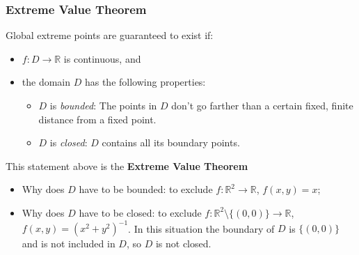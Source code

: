 \begin{frame}
  \frametitle{Extreme Value Theorem}

Global extreme points are guaranteed to exist if:

\begin{itemize}
  \item $f \colon D \to \mathbb{R}$ is continuous, and
  \item the domain $D$ has the following properties:
  \begin{itemize}
    \item $D$ is \emph{bounded}: The points in $D$ don't go farther than a certain fixed, finite distance from a fixed point.
    \item $D$ is \emph{closed}: $D$ contains all its boundary points.
  \end{itemize}
\end{itemize}
%

This statement above is the \textbf{Extreme Value Theorem}

\begin{itemize}
  \item \pause Why does $D$ have to be bounded: \pause to exclude $f\colon \mathbb{R}^2 \to \mathbb{R}$, $f(x,y) = x$;
  \item \pause Why does $D$ have to be closed: \pause to exclude $f\colon \mathbb{R}^2\setminus\{(0,0)\} \to \mathbb{R}$, $f(x,y) = (x^2+y^2)^{-1}$. In this situation the boundary of $D$ is $\{(0,0)\}$ and is not included in $D$, so $D$ is not closed.
\end{itemize}
\end{frame}
